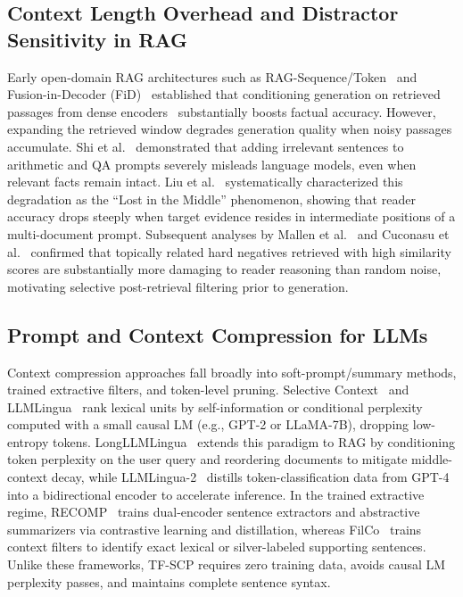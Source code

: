 \documentclass[conference]{IEEEtran}
\begin{document}
\subsection{Context Length Overhead and Distractor Sensitivity in RAG}
Early open-domain RAG architectures such as RAG-Sequence/Token~\cite{lewis2020rag} and Fusion-in-Decoder (FiD)~\cite{izacard2021fid} established that conditioning generation on retrieved passages from dense encoders~\cite{karpukhin2020dpr} substantially boosts factual accuracy. However, expanding the retrieved window degrades generation quality when noisy passages accumulate. Shi et al.~\cite{shi2023distracted} demonstrated that adding irrelevant sentences to arithmetic and QA prompts severely misleads language models, even when relevant facts remain intact. Liu et al.~\cite{liu2024lost} systematically characterized this degradation as the ``Lost in the Middle'' phenomenon, showing that reader accuracy drops steeply when target evidence resides in intermediate positions of a multi-document prompt. Subsequent analyses by Mallen et al.~\cite{mallen2023not} and Cuconasu et al.~\cite{cuconasu2024noise} confirmed that topically related hard negatives retrieved with high similarity scores are substantially more damaging to reader reasoning than random noise, motivating selective post-retrieval filtering prior to generation.

\subsection{Prompt and Context Compression for LLMs}
Context compression approaches fall broadly into soft-prompt/summary methods, trained extractive filters, and token-level pruning. Selective Context~\cite{li2023selective} and LLMLingua~\cite{jiang2023llmlingua} rank lexical units by self-information or conditional perplexity computed with a small causal LM (e.g., GPT-2 or LLaMA-7B), dropping low-entropy tokens. LongLLMLingua~\cite{jiang2024longllmlingua} extends this paradigm to RAG by conditioning token perplexity on the user query and reordering documents to mitigate middle-context decay, while LLMLingua-2~\cite{pan2024llmlingua2} distills token-classification data from GPT-4 into a bidirectional encoder to accelerate inference. In the trained extractive regime, RECOMP~\cite{xu2024recomp} trains dual-encoder sentence extractors and abstractive summarizers via contrastive learning and distillation, whereas FilCo~\cite{wang2023filco} trains context filters to identify exact lexical or silver-labeled supporting sentences. Unlike these frameworks, TF-SCP requires zero training data, avoids causal LM perplexity passes, and maintains complete sentence syntax.
\end{document}
